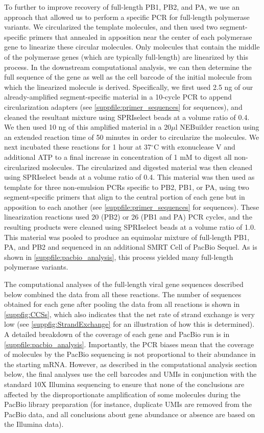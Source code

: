 \documentclass[]{asm-article}
\newcommand{\SUPPFILE}[1]{\autoref{suppfile:#1}}
\newcommand{\SUPPFIG}[1]{\autoref{suppfig:#1}}
\begin{document}
To further to improve recovery of full-length PB1, PB2, and PA, we use an approach that allowed us to perform a specific PCR for full-length polymerase variants.
We circularized the template molecules, and then used two segment-specific primers that annealed in apposition near the center of each polymerase gene to linearize these circular molecules.
Only molecules that contain the middle of the polymerase genes (which are typically full-length) are linearized by this process.
In the downstream computational analysis, we can then determine the full sequence of the gene as well as the cell barcode of the initial molecule from which the linearized molecule is derived.
Specifically, we first used 2.5 ng of our already-amplified segment-specific material in a 10-cycle PCR to append circularization adapters (see \SUPPFILE{primer_sequences} for sequences), and cleaned the resultant mixture using SPRIselect beads at a volume ratio of 0.4.
We then used 10 ng of this amplified material in a 20$\mu$l NEBuilder reaction using an extended reaction time of 50 minutes in order to circularize the molecules.
We next incubated these reactions for 1 hour at 37$^{\circ}$C with exonuclease V and additional ATP to a final increase in concentration of 1 mM to digest all non-circularized molecules.
The circularized and digested material was then cleaned using SPRIselect beads at a volume ratio of 0.4.
This material was then used as template for three non-emulsion PCRs specific to PB2, PB1, or PA, using two segment-specific primers that align to the central portion of each gene but in apposition to each another (see \SUPPFILE{primer_sequences} for sequences).
These linearization reactions used 20 (PB2) or 26 (PB1 and PA) PCR cycles, and the resulting products were cleaned using SPRIselect beads at a volume ratio of 1.0.
This material was pooled to produce an equimolar mixture of full-length PB1, PA, and PB2 and sequenced in an additional SMRT Cell of PacBio Sequel. 
As is shown in \SUPPFILE{pacbio_analysis}, this process yielded many full-length polymerase variants.

The computational analyses of the full-length viral gene sequences described below combined the data from all these reactions.
The number of sequences obtained for each gene after pooling the data from all reactions is shown in \SUPPFIG{CCSs}, which also indicates that the net rate of strand exchange is very low (see \SUPPFIG{StrandExchange} for an illustration of how this is determined).
A detailed breakdown of the coverage of each gene and PacBio run is in \SUPPFILE{pacbio_analysis}.
Importantly, the PCR biases mean that the coverage of molecules by the PacBio sequencing is not proportional to their abundance in the starting mRNA.
However, as described in the computational analysis section below, the final analyses use the cell barcodes and UMIs in conjunction with the standard 10X Illumina sequencing to ensure that none of the conclusions are affected by the disproportionate amplification of some molecules during the PacBio library preparation (for instance, duplicate UMIs are removed from the PacBio data, and all conclusions about gene abundance or absence are based on the Illumina data).
\end{document}
